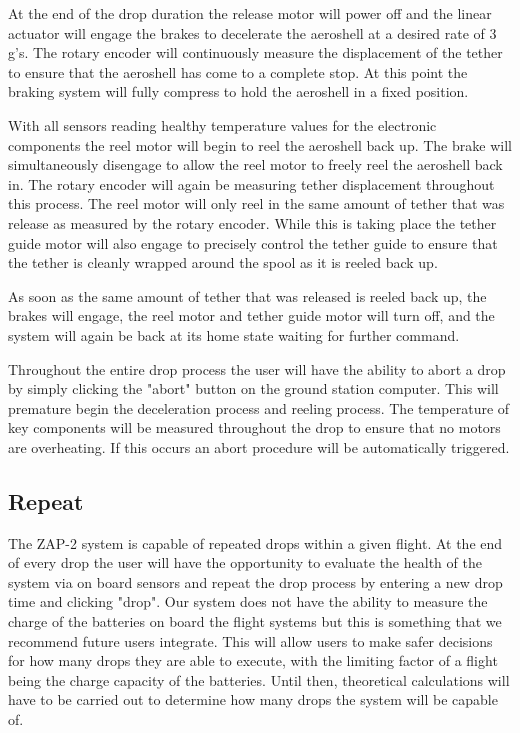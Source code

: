 At the end of the drop duration the release motor will power off and the linear actuator will engage the brakes to decelerate the aeroshell at a desired rate of 3 g's. The rotary encoder will continuously measure the displacement of the tether to ensure that the aeroshell has come to a complete stop. At this point the braking system will fully compress to hold the aeroshell in a fixed position. 

With all sensors reading healthy temperature values for the electronic components the reel motor will begin to reel the aeroshell back up. The brake will simultaneously disengage to allow the reel motor to freely reel the aeroshell back in. The rotary encoder will again be measuring tether displacement throughout this process. The reel motor will only reel in the same amount of tether that was release as measured by the rotary encoder. While this is taking place the tether guide motor will also engage to precisely control the tether guide to ensure that the tether is cleanly wrapped around the spool as it is reeled back up. 

As soon as the same amount of tether that was released is reeled back up, the brakes will engage, the reel motor and tether guide motor will turn off, and the system will again be back at its home state waiting for further command. 

Throughout the entire drop process the user will have the ability to abort a drop by simply clicking the "abort" button on the ground station computer. This will premature begin the deceleration process and reeling process. The temperature of key components will be measured throughout the drop to ensure that no motors are overheating. If this occurs an abort procedure will be automatically triggered.

\subsection*{Repeat}

\indent\indent The ZAP-2 system is capable of repeated drops within a given flight. At the end of every drop the user will have the opportunity to evaluate the health of the system via on board sensors and repeat the drop process by entering a new drop time and clicking "drop". Our system does not have the ability to measure the charge of the batteries on board the flight systems but this is something that we recommend future users integrate. This will allow users to make safer decisions for how many drops they are able to execute, with the limiting factor of a flight being the charge capacity of the batteries. Until then, theoretical calculations will have to be carried out to determine how many drops the system will be capable of. 

